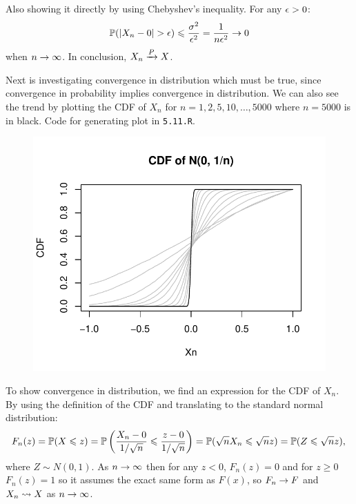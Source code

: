 Also showing it directly by using Chebyshev's inequality. For any $\eps > 0$:
$$
\P(|X_n - 0| > \eps) \leq \frac{\sigma^2}{\eps^2} = \frac{1}{n\eps^2} \ra  0
$$
when $n\ra\infty$. In conclusion, $X_n\raP X$.

Next is investigating convergence in distribution which must be true, since convergence
in probability implies convergence in distribution. We can also see the trend by
plotting the CDF of $X_n$ for $n=1, 2, 5, 10, \ldots, 5000$ where $n=5000$ is in black.
Code for generating plot in \texttt{5.11.R}.
\begin{figure}[H]
    \centering
    \includegraphics[scale=0.8]{ch5_11.pdf}
\end{figure}
To show convergence in distribution, we find an expression for the CDF of $X_n$.
By using the definition of the CDF and translating to the standard normal distribution:
$$
F_n(z) = \P(X\leq z) = \P\left(\frac{X_n - 0}{1/\sqrt{n}}\leq \frac{z - 0}{1/\sqrt{n}}\right)
= \P(\sqrt{n}X_n \leq \sqrt{n}z) = \P(Z\leq \sqrt{n}z),
$$
where $Z\sim N(0,1)$. As $n\ra\infty$ then for any $z<0$, $F_n(z) = 0$ and for $z\geq 0$
$F_n(z) = 1$ so it assumes the exact same form as $F(x)$, so $F_n\ra F$ and $X_n\raD X$
as $n\ra\infty$.

